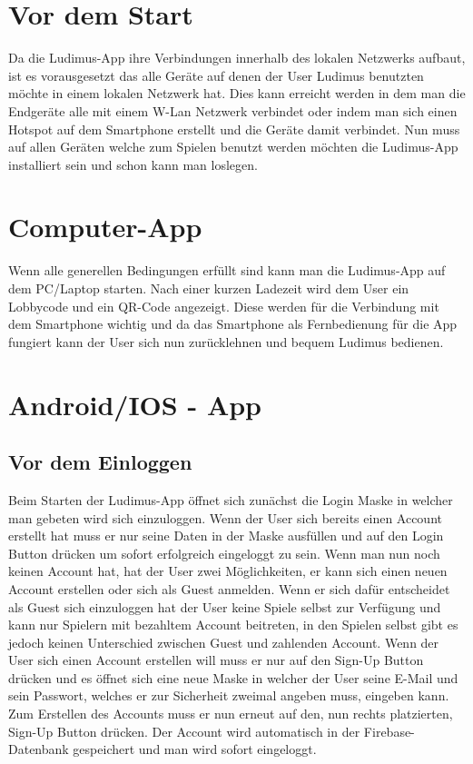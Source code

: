 \section{Vor dem Start}
Da die Ludimus-App ihre Verbindungen innerhalb des lokalen Netzwerks aufbaut, ist es vorausgesetzt das alle Geräte auf denen der User Ludimus benutzten möchte in einem lokalen Netzwerk hat. Dies kann erreicht werden in dem man die Endgeräte alle mit einem W-Lan Netzwerk verbindet oder indem man sich einen Hotspot auf dem Smartphone erstellt und die Geräte damit verbindet. Nun muss auf allen Geräten welche zum Spielen benutzt werden möchten die Ludimus-App installiert sein und schon kann man loslegen.
\section{Computer-App}
Wenn alle generellen Bedingungen erfüllt sind kann man die Ludimus-App auf dem PC/Laptop starten. Nach einer kurzen Ladezeit wird dem User ein Lobbycode und ein QR-Code angezeigt. Diese werden für die Verbindung mit dem Smartphone wichtig und da das Smartphone als Fernbedienung für die App fungiert kann der User sich nun zurücklehnen und bequem Ludimus bedienen.
\section{Android/IOS - App}
\subsection{Vor dem Einloggen}
Beim Starten der Ludimus-App öffnet sich zunächst die Login Maske in welcher man gebeten wird sich einzuloggen. Wenn der User sich bereits einen Account erstellt hat muss er nur seine Daten in der Maske ausfüllen und auf den Login Button drücken um sofort erfolgreich eingeloggt zu sein. Wenn man nun noch keinen Account hat, hat der User zwei Möglichkeiten, er kann sich einen neuen Account erstellen oder sich als Guest anmelden. Wenn er sich dafür entscheidet als Guest sich einzuloggen hat der User keine Spiele selbst zur Verfügung und kann nur Spielern mit bezahltem Account beitreten, in den Spielen selbst gibt es jedoch keinen Unterschied zwischen Guest und zahlenden Account. Wenn der User sich einen Account erstellen will muss er nur auf den Sign-Up Button drücken und es öffnet sich eine neue Maske in welcher der User seine E-Mail und sein Passwort, welches er zur Sicherheit zweimal angeben muss, eingeben kann. Zum Erstellen des Accounts muss er nun erneut auf den, nun rechts platzierten, Sign-Up Button drücken. Der Account wird automatisch in der Firebase-Datenbank gespeichert und man wird sofort eingeloggt.
